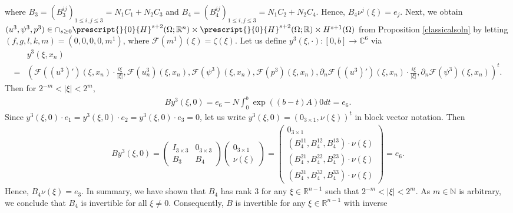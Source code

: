 \documentclass[11pt,letterpaper,reqno]{amsart}
\numberwithin{equation}{section}
\newcommand{\abs}[1]{\left\lvert#1\right\rvert}
\begin{document}
where \(B_{3}=(B_{3}^{ij})_{1 \leq i,j \leq 3}=N_{1}C_{1}+N_{2}C_{3}\) and \(B_{4}=(B_{4}^{ij})_{1 \leq i,j \leq 3}=N_{1}C_{2}+N_{2}C_{4}\). Hence, \(B_{4}\nu^{j}(\xi)=e_{j}\). Next, we obtain \((u^{3}, \psi^{3}, p^{3}) \in \cap_{s \geq 0}\prescript{}{0}{H}^{s+2}(\Omega;\mathbb{R}^{n}) \times \prescript{}{0}{H}^{s+2}(\Omega;\mathbb{R}) \times H^{s+1}(\Omega)\) from Proposition \ref{classicalsoln} by letting \((f,g,l,k,m)=(0,0,0,0,m^{1})\), where \(\mathcal{F}(m^{1})(\xi)=\zeta(\xi)\). Let us define \(y^{3}(\xi,\cdot): [0,b] \to \mathbb{C}^{6}\) via
\begin{align}
    &y^{3}(\xi,x_{n}) \nonumber\\
    =&\left(\mathcal{F}((u^{3})')(\xi,x_{n})\cdot\frac{i\xi}{\abs{\xi}},\mathcal{F}(u_{n}^{3})(\xi,x_{n}), \mathcal{F}(\psi^{3})(\xi,x_{n}),\mathcal{F}(p^{3})(\xi,x_{n}),\partial_{n}\mathcal{F}((u^{3})')(\xi,x_{n}) \cdot \frac{i\xi}{\abs{\xi}},\partial_{n}\mathcal{F}(\psi^{3})(\xi,x_{n})\right)^{t}.
\end{align}
Then for \(2^{-m}<\abs{\xi}<2^{m}\),
\begin{align}
    By^{3}(\xi,0) = 
    e_6
    -N\int_{0}^{b}\exp((b-t)A) 0
    dt=
    e_6    .
\end{align}
Since \(y^{3}(\xi,0) \cdot e_{1}=y^{3}(\xi,0)\cdot e_{2}=y^{3}(\xi,0)\cdot e_{3}=0\), let us write \(y^{3}(\xi,0)=(0_{3 \times 1},\nu(\xi))^{t}\) in block vector notation. Then
\begin{align}
    By^{3}(\xi,0)=
    \begin{pmatrix}
        I_{3 \times 3} & 0_{3 \times 3} \\
        B_{3} & B_{4}
    \end{pmatrix}
    \begin{pmatrix}
        0_{3 \times 1} \\
        \nu(\xi)
    \end{pmatrix}
    =
    \begin{pmatrix}
        0_{3 \times 1} \\
        (B_{4}^{11}, B_{4}^{12}, B_{4}^{13})\cdot \nu(\xi) \\
        (B_{4}^{21}, B_{4}^{22}, B_{4}^{23})\cdot \nu(\xi) \\
        (B_{4}^{31}, B_{4}^{32}, B_{4}^{33})\cdot \nu(\xi)
    \end{pmatrix}
    = e_6    .
\end{align}
Hence, \(B_{4}\nu(\xi)=e_{3}\). In summary, we have shown that \(B_{4}\) has rank \(3\) for any \(\xi \in \mathbb{R}^{n-1}\) such that \(2^{-m}<\abs{\xi} <2^{m}\). As \(m \in \mathbb{N}\) is arbitrary, we conclude that \(B_{4}\) is invertible for all \(\xi \neq 0\). Consequently, \(B\) is invertible for any \(\xi \in \mathbb{R}^{n-1}\) with inverse
\end{document}
